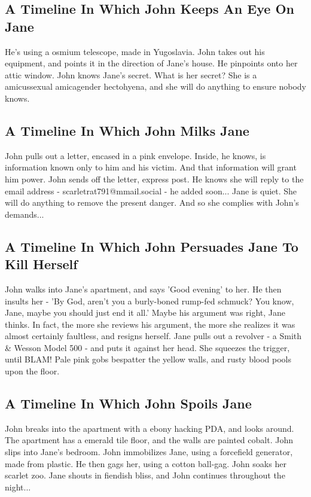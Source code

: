 \documentclass{article}
\begin{document}
\subsection{A Timeline In Which John Keeps An Eye On Jane}


He's using a osmium telescope, made in Yugoslavia.
John takes out his equipment, and points it in the direction of Jane's house. He pinpoints onto her attic window.
John knows Jane's secret. What is her secret? She is a amicussexual amicagender hectohyena, and she will do anything to ensure nobody knows.
\subsection{A Timeline In Which John Milks Jane}


John pulls out a letter, encased in a pink envelope. Inside, he knows, is information known only to him and his victim. And that information will grant him power.
John sends off the letter, express post. He knows she will reply to the email address {-} scarletrat791@mmail.social {-} he added soon...
Jane is quiet. She will do anything to remove the present danger. And so she complies with John's demands...
\subsection{A Timeline In Which John Persuades Jane To Kill Herself}


John walks into Jane's apartment, and says 'Good evening' to her.
He then insults her {-} 'By God, aren't you a burly{-}boned rump{-}fed schmuck?
You know, Jane, maybe you should just end it all.'
Maybe his argument was right, Jane thinks.
In fact, the more she reviews his argument, the more she realizes it was almost certainly faultless, and resigns herself.
Jane pulls out a revolver {-} a Smith \& Wesson Model 500 {-} and puts it against her head.
She squeezes the trigger, until BLAM!
Pale pink gobs bespatter the yellow walls, and rusty blood pools upon the floor.
\subsection{A Timeline In Which John Spoils Jane}


John breaks into the apartment with a ebony hacking PDA, and looks around.
The apartment has a emerald tile floor, and the walls are painted cobalt.
John slips into Jane's bedroom.
John immobilizes Jane, using a forcefield generator, made from plastic.
He then gags her, using a cotton ball{-}gag.
John soaks her scarlet zoo.
Jane shouts in fiendish bliss, and John continues throughout the night...
\end{document}
